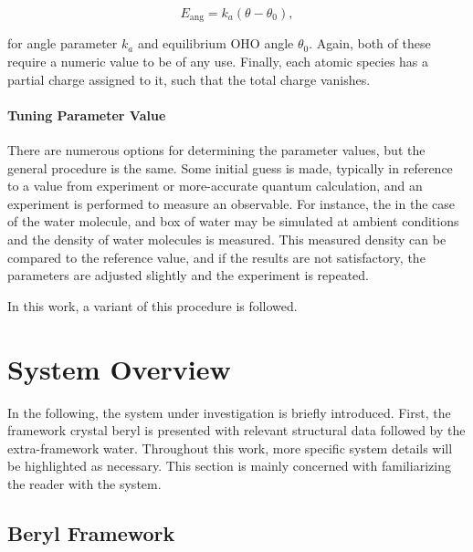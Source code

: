             \begin{equation}
                E_\text{ang} = k_a(\theta - \theta_0),
            \end{equation}
            
            \noindent for angle parameter $k_a$ and equilibrium OHO angle $\theta_0$. Again, both of these require a numeric value to be of any use. Finally, each atomic species has a partial charge assigned to it, such that the total charge vanishes.
            
            \paragraph{Tuning Parameter Value} There are numerous options for determining the parameter values, but the general procedure is the same. Some initial guess is made, typically in reference to a value from experiment or more-accurate quantum calculation, and an experiment is performed to measure an observable. For instance, the in the case of the water molecule, and box of water may be simulated at ambient conditions and the density of water molecules is measured. This measured density can be compared to the reference value, and if the results are not satisfactory, the parameters are adjusted slightly and the experiment is repeated.
            
            In this work, a variant of this procedure is followed.

    \section{System Overview}
    
    In the following, the system under investigation is briefly introduced. First, the framework crystal beryl is presented with relevant structural data followed by the extra-framework water. Throughout this work, more specific system details will be highlighted as necessary. This section is mainly concerned with familiarizing the reader with the system.
    
        \subsection{Beryl Framework}
        
